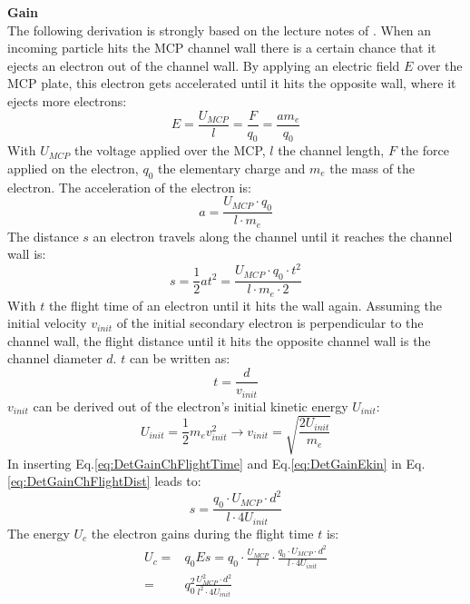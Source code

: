 		\textbf{Gain}\\
		The following derivation is strongly based on the lecture notes of \cite{LecNot_Wurz2017}.	When an incoming particle hits the MCP channel wall there is a certain chance that it ejects an electron out of the channel wall. By applying an electric field $E$ over the MCP plate, this electron gets accelerated until it hits the opposite wall, where it ejects more electrons:
		\begin{equation}
			E = \frac{U_{MCP}}{l} = \frac{F}{q_0} = \frac{a m_e}{q_0}
		\end{equation}
		With $U_{MCP}$ the voltage applied over the MCP, $l$ the channel length, $F$ the force applied on the electron, $q_0$ the elementary charge and $m_e$ the mass of the electron. The acceleration of the electron is:		
		\begin{equation}
			a = \frac{U_{MCP}\cdot q_0}{l\cdot m_e}
		\end{equation}
		The distance $s$ an electron travels along the channel until it reaches the channel wall is:
		\begin{equation}
			s = \frac{1}{2}at^2 = \frac{U_{MCP}\cdot q_0\cdot t^2}{l\cdot m_e\cdot 2}
			\label{eq:DetGainChFlightDist}
		\end{equation}
		With $t$ the flight time of an electron until it hits the wall again. Assuming the initial velocity $v_{init}$ of the initial secondary electron is perpendicular to the channel wall, the flight distance until it hits the opposite channel wall is the channel diameter $d$. $t$ can be written as:
		\begin{equation}
			t = \frac{d}{v_{init}}
			\label{eq:DetGainChFlightTime}
		\end{equation}
		$v_{init}$ can be derived out of the electron's initial kinetic energy $U_{init}$:
		\begin{equation}
			U_{init} = \frac{1}{2}m_e v_{init}^2 \rightarrow v_{init} = \sqrt{\frac{2U_{init}}{m_e}}
			\label{eq:DetGainEkin}
		\end{equation}
		In inserting Eq.\eqref{eq:DetGainChFlightTime} and Eq.\eqref{eq:DetGainEkin} in Eq.\eqref{eq:DetGainChFlightDist} leads to:
		\begin{equation}
			s = \frac{q_0 \cdot U_{MCP}\cdot d^2}{l\cdot 4U_{init}}
			\label{eq:DetGainDistECh}
		\end{equation}
		The energy $U_c$ the electron gains during the flight time $t$ is:
		\begin{align}
			U_c = &q_0 Es = q_0\cdot \frac{U_{MCP}}{l}\cdot\frac{q_0\cdot U_{MCP}\cdot d^2}{l\cdot 4 U_{init}}\\
			= &q_0^2 \frac{U_{MCP}^2\cdot d^2}{l^2\cdot 4U_{init}}
		\end{align}

